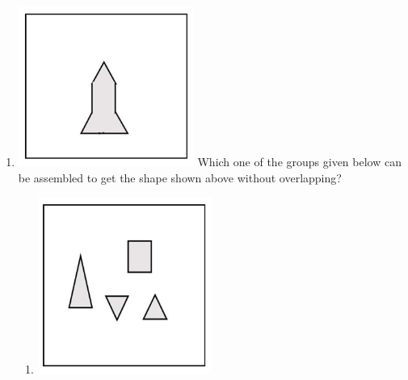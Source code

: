 \documentclass[a4paper, 11pt]{article}
\begin{document}
\begin{enumerate}
\item \centering \includegraphics[width=\columnwidth]{figs/fig_5.png} Which one of the groups given below can be assembled to get the shape shown above without overlapping?
\begin{enumerate}
    \item \includegraphics[width=\columnwidth]{figs/fig_5.1.png}

\end{enumerate}
\end{enumerate}
\end{document}
